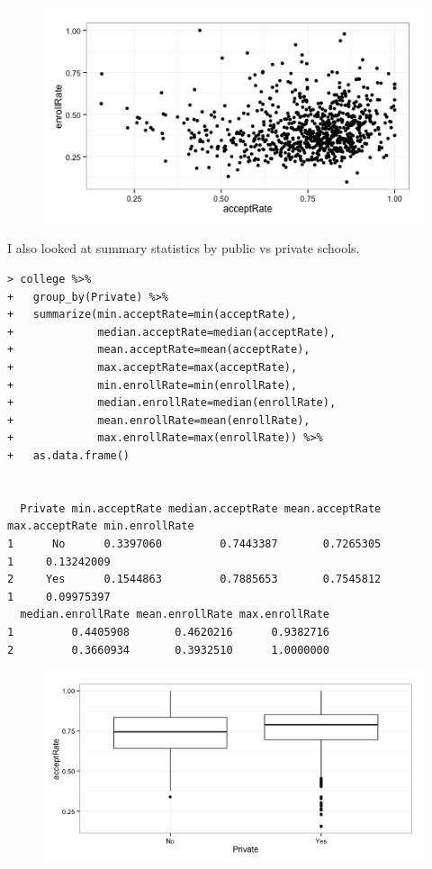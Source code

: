 \documentclass[11pt]{article}
\begin{document}
\begin{figure}[H]
	\centering
	\includegraphics[width=5.5in]{8cvi_enroll_vs_accept.png}
\end{figure}


I also looked at summary statistics by public vs private schools.
\begin{verbatim}
> college %>%
+   group_by(Private) %>%
+   summarize(min.acceptRate=min(acceptRate),
+             median.acceptRate=median(acceptRate),
+             mean.acceptRate=mean(acceptRate),
+             max.acceptRate=max(acceptRate),
+             min.enrollRate=min(enrollRate),
+             median.enrollRate=median(enrollRate),
+             mean.enrollRate=mean(enrollRate),
+             max.enrollRate=max(enrollRate)) %>%
+   as.data.frame()


  Private min.acceptRate median.acceptRate mean.acceptRate max.acceptRate min.enrollRate
1      No      0.3397060         0.7443387       0.7265305              1     0.13242009
2     Yes      0.1544863         0.7885653       0.7545812              1     0.09975397
  median.enrollRate mean.enrollRate max.enrollRate
1         0.4405908       0.4620216      0.9382716
2         0.3660934       0.3932510      1.0000000
\end{verbatim}



\begin{figure}[H]
	\centering
	\includegraphics[width=5.5in]{8cvi_acceptRate_boxplots.png}
\end{figure}
\end{document}
